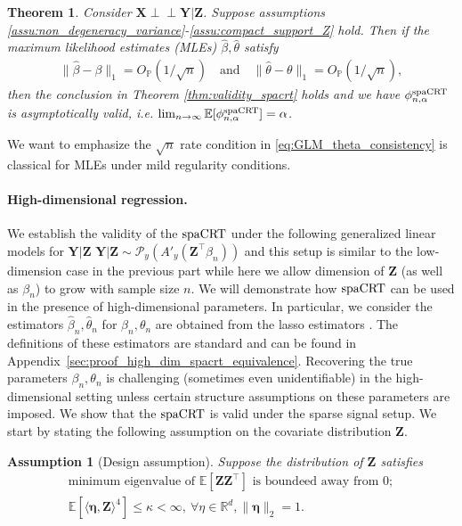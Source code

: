 \documentclass[12pt]{article}
\newtheorem{assumption}{Assumption}
\newtheorem{theorem}{Theorem}
\theoremstyle{definition}
\newcommand{\indep}{\perp \!\!\! \perp}
\def\P{\mathbb{P}}
\def\P{\mathbb{P}}
\newcommand{\E}{\mathbb E}								%
\renewcommand{\P}{\mathbb{P}}							%
\newcommand{\prx}{\bm X}								%
\newcommand{\prz}{\bm Z}								%
\newcommand{\pry}{{\bm Y}}								%
\newcommand{\spacrt}{\textnormal{spaCRT}}               %
\begin{document}
  \begin{theorem}\label{thm:low_dim_glm_spacrt}
	Consider $\prx\indep\pry|\prz$. Suppose assumptions \ref{assu:non_degeneracy_variance}-\ref{assu:compact_support_Z} hold. Then if the maximum likelihood estimates (MLEs) $\widehat{\beta},\widehat{\theta}$ satisfy
	\begin{align}\label{eq:GLM_theta_consistency}
	  \|\widehat{\beta}-\beta\|_1=O_\P(1/\sqrt{n})\quad\text{and}\quad\|\widehat{\theta}-\theta\|_1=O_\P(1/\sqrt{n}),
	\end{align}
	then the conclusion in Theorem \ref{thm:validity_spacrt} holds and we have $\phi_{n,\alpha}^\mathrm{\spacrt}$ is asymptotically valid, i.e. $\lim_{n\rightarrow\infty}\E[\phi_{n,\alpha}^{\spacrt}]=\alpha$.
  \end{theorem}
  We want to emphasize the $\sqrt{n}$ rate condition in \eqref{eq:GLM_theta_consistency} is classical for MLEs under mild regularity conditions.
  
  
  \paragraph{High-dimensional regression.}
   
  We establish the validity of the $\spacrt$ under the following generalized linear models for $\pry|\prz$ $\pry|\prz\sim \mathcal{P}_y(A'_{y}(\prz^\top \beta_{n}))$ and this setup is similar to the low-dimension case in the previous part while here we allow dimension of $\prz$ (as well as $\beta_n$) to grow with sample size $n$. We will demonstrate how $\spacrt$ can be used in the presence of high-dimensional parameters. In particular, we consider the estimators $\widehat{\beta}_n,\widehat{\theta}_n$ for $\beta_n,\theta_n$ are obtained from the lasso estimators \citep{tibshirani1996regression}. The definitions of these estimators are standard and can be found in Appendix~\ref{sec:proof_high_dim_spacrt_equivalence}. Recovering the true parameters $\beta_n,\theta_n$ is challenging (sometimes even unidentifiable) in the high-dimensional setting unless certain structure assumptions on these parameters are imposed. We show that the $\spacrt$ is valid under the sparse signal setup. We start by stating the following assumption on the covariate distribution $\prz$.
  
  \begin{assumption}[Design assumption]\label{assu:design_assumption}
	Suppose the distribution of $\prz$ satisfies
	\begin{align}
	  \text{minimum eigenvalue of }\E[\prz\prz^\top]\text{ is boundeed away from }0;\label{eq:boundedness_eigenvalue}\\
	  \E[\langle \bm \eta, \prz \rangle^4]\leq \kappa <\infty,\  \forall \eta\in\mathbb{R}^{d}, \|\bm\eta\|_2=1.\label{eq:fourth_moment_XZ}
	\end{align} 
  \end{assumption}
  
\end{document}
